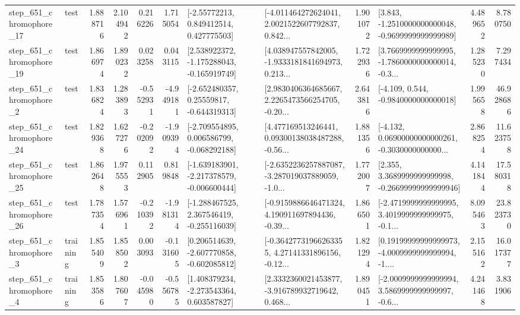 \begin{tabular}{llrrrrllrlrr}
  step\_651\_chromophore\_17 &      test &      1.888716 &    2.104942 &      0.216226 &  1.715054 &     [-2.55772213, 0.849412514, 0.427775503] &  [-4.011464272624041, 2.0021522607792837, 0.842... &       1.901072 &  [3.843, -1.2510000000000048, -0.9699999999999989] &            4.489652 &          8.780750 \\
  step\_651\_chromophore\_19 &      test &      1.866974 &    1.890232 &      0.023258 &  0.043115 &   [2.538922372, -1.175288043, -0.165919749] &  [4.038947557842005, -1.9333181841694973, 0.213... &       1.722936 &  [3.7669999999999995, -1.7860000000000014, -0.3... &            1.285230 &          7.297434 \\
   step\_651\_chromophore\_2 &      test &      1.836824 &    1.283893 &     -0.552931 & -4.949181 &    [-2.652480357, 0.25559817, -0.644319313] &  [2.9830406364685667, 2.2265473566254705, -0.20... &       2.643816 &               [-4.109, 0.544, -0.9840000000000018] &            1.995658 &         46.928686 \\
  step\_651\_chromophore\_24 &      test &      1.829368 &    1.627276 &     -0.202092 & -1.909394 &   [-2.709554895, 0.006586799, -0.068292188] &  [4.477169513246441, 0.09300138038487288, -0.56... &       1.881356 &  [-4.132, 0.06900000000000261, -0.3030000000000... &            2.868254 &         11.623758 \\
  step\_651\_chromophore\_25 &      test &      1.862648 &    1.975553 &      0.112905 &  0.819848 &  [-1.639183901, -2.217378579, -0.006600444] &  [-2.6352236257887087, -3.287019037889059, -1.0... &       1.772007 &  [2.355, 3.3689999999999998, -0.26699999999999946] &            4.141844 &         17.580318 \\
  step\_651\_chromophore\_26 &      test &      1.787354 &    1.576961 &     -0.210392 & -1.981314 &   [-1.288467525, 2.367546419, -0.255116039] &  [-0.9159886646471324, 4.190911697894436, -0.39... &       1.866501 &  [-2.4719999999999995, 3.4019999999999975, -0.1... &            8.095463 &         23.823730 \\
   step\_651\_chromophore\_3 &  training &      1.855409 &    1.858502 &      0.003093 & -0.131605 &   [0.206514639, -2.607770858, -0.602085812] &  [-0.36427731966263355, 4.27141331896156, -0.12... &       1.821294 &  [0.19199999999999973, -4.0009999999999994, -1.... &            2.155162 &         16.017377 \\
   step\_651\_chromophore\_4 &  training &      1.853586 &    1.807607 &     -0.045980 & -0.556785 &    [1.408379234, -2.273543364, 0.603587827] &  [2.3332360021453877, -3.916789932719642, 0.468... &       1.890451 &  [-2.0009999999999994, 3.5869999999999997, -0.6... &            4.241468 &          3.831906 \\

\end{tabular}
